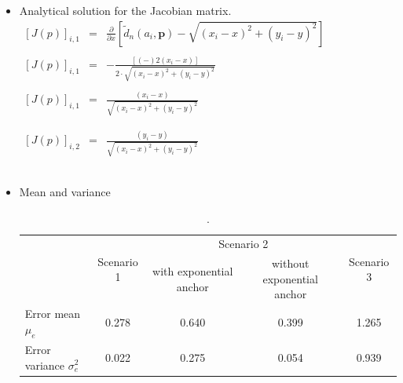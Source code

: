 \documentclass{article}
\begin{document}
\begin{itemize}

	\item Analytical solution for the Jacobian matrix.\\
	
	    $\begin{array}{ccc}
    
        \left[ J(p)\right]_{i,1} & = & \frac{\partial}{\partial x} \left[ \tilde{d}_n(a_i,\mathbf{p}) - \sqrt{(x_i - x)^2 + (y_i - y)^2} \right] \\\\
        \left[ J(p) \right]_{i,1} & = & -\frac{[(-)2(x_i-x)]}{2 \cdot\sqrt{(x_i - x)^2 + (y_i - y)^2}} \\\\
        \left[ J(p) \right]_{i,1} & = & \frac{(x_i-x)}{\sqrt{(x_i - x)^2 + (y_i - y)^2}}\\\\\\
        
        
        \left[ J(p) \right]_{i,2} & = & \frac{(y_i-y)}{\sqrt{(x_i - x)^2 + (y_i - y)^2}}\\\\\\

    \end{array}$


    \item Mean and variance

        \begin{table}[h]
        \centering
        \begin{tabular}{l||c||c|c||c|}
            \cline{2-5}
                                                       & \multirow{2}{*}{Scenario 1} & \multicolumn{2}{c||}{Scenario 2}                      & \multirow{2}{*}{Scenario 3} \\ \cline{3-4}
                                                       &                             & with exponential anchor & without exponential anchor &                             \\ \hline\hline
            \multicolumn{1}{|l||}{Error mean $\mu_{e}$}          & 0.278                      & 0.640                  & 0.399                     & 1.265                      \\ \hline
            \multicolumn{1}{|l||}{Error variance $\sigma^2_{e}$} & 0.022                      & 0.275                  & 0.054                     & 0.939                      \\ \hline
        \end{tabular}
        \caption{.}
        \label{tab:ls_mean_var}
        \end{table}
        

\end{itemize}
\end{document}
